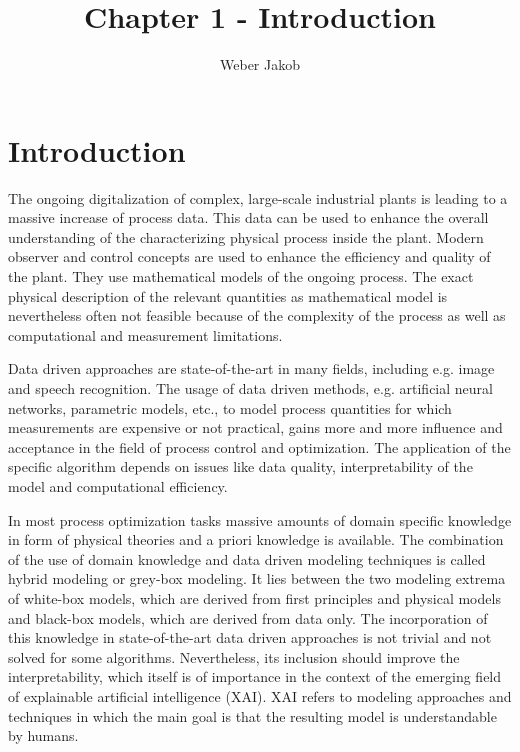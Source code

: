 \documentclass[10pt,a4paper]{article}
\title{Chapter 1 - Introduction}
\author{Weber Jakob}
\begin{document}
	\maketitle

\tableofcontents

\section{Introduction}

The ongoing digitalization of complex, large-scale industrial plants is leading to a massive increase of process data. This data can be used to enhance the overall understanding of the characterizing physical process inside the plant. Modern observer and control concepts are used to enhance the efficiency and quality  of the plant. They use mathematical models of the ongoing process. The exact physical description of the relevant quantities as mathematical model is nevertheless often not feasible because of the complexity of the process as well as computational and measurement limitations.

Data driven approaches are state-of-the-art in many fields, including e.g. image and speech recognition. The usage of data driven methods, e.g. artificial neural networks, parametric models, etc., to model process quantities for which measurements are expensive or not practical, gains more and more influence and acceptance in the field of process control and optimization. The application of the specific algorithm depends on issues like data quality, interpretability of the model and computational efficiency. 

In most process optimization tasks massive amounts of domain specific knowledge in form of physical theories and a priori knowledge is available. The combination of the use of domain knowledge and data driven modeling techniques is called hybrid modeling or grey-box modeling. It lies between the two modeling extrema of white-box models, which are derived from first principles and physical models and black-box models, which are derived from data only.\cite{ashby1961introduction} The incorporation of this knowledge in state-of-the-art data driven approaches is not trivial and not solved for some algorithms. Nevertheless, its inclusion should improve the interpretability, which itself is of importance in the context of the emerging field of explainable artificial intelligence (XAI). XAI refers to modeling approaches and techniques in which the main goal is that the resulting model is understandable by humans. \cite{dovsilovic2018explainable}
\end{document}
